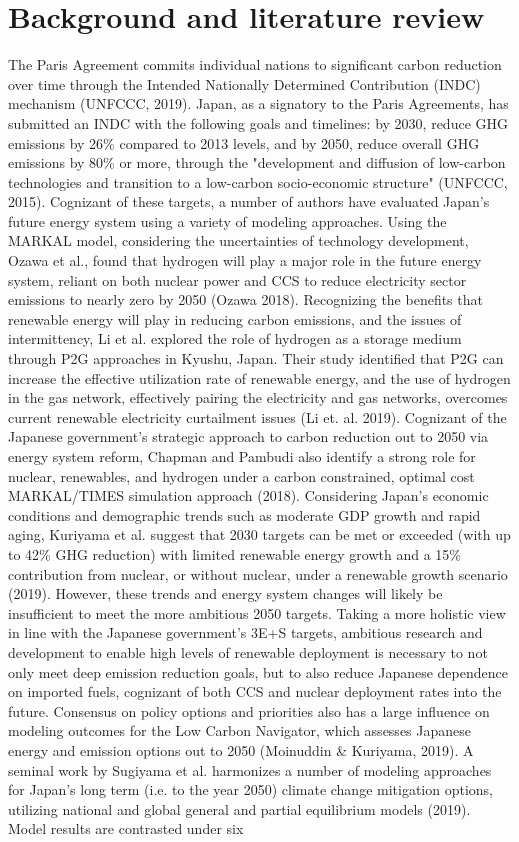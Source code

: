 \section{Background and literature review} \label{litreview}
The Paris Agreement commits individual nations to significant carbon reduction over time through the Intended Nationally Determined Contribution (INDC) mechanism (UNFCCC, 2019). Japan, as a signatory to the Paris Agreements, has submitted an INDC with the following goals and timelines: by 2030, reduce GHG emissions by 26\% compared to 2013 levels, and by 2050, reduce overall GHG emissions by 80\% or more, through the "development and diffusion of low-carbon technologies and transition to a low-carbon socio-economic structure" (UNFCCC, 2015). Cognizant of these targets, a number of authors have evaluated Japan's future energy system using a variety of modeling approaches. Using the \gls{MARKAL} model, considering the uncertainties of technology development, Ozawa et al., found that hydrogen will play a major role in the future energy system, reliant on both nuclear power and \gls{CCS} to reduce electricity sector emissions to nearly zero by 2050 (Ozawa 2018). Recognizing the benefits that renewable energy will play in reducing carbon emissions, and the issues of intermittency, Li et al. explored the role of hydrogen as a storage medium through \gls{P2G} approaches in Kyushu, Japan. Their study identified that \gls{P2G} can increase the effective utilization rate of renewable energy, and the use of hydrogen in the gas network, effectively pairing the electricity and gas networks, overcomes current renewable electricity curtailment issues (Li et. al. 2019). Cognizant of the Japanese government's strategic approach to carbon reduction out to 2050 via energy system reform, Chapman and Pambudi also identify a strong role for nuclear, renewables, and hydrogen under a carbon constrained, optimal cost MARKAL/TIMES simulation approach (2018). Considering Japan's economic conditions and demographic trends such as moderate GDP growth and rapid aging, Kuriyama et al. suggest that 2030 targets can be met or exceeded (with up to 42\% GHG reduction) with limited renewable energy growth and a 15\% contribution from nuclear, or without nuclear, under a renewable growth scenario (2019). However, these trends and energy system changes will likely be insufficient to meet the more ambitious 2050 targets. Taking a more holistic view in line with the Japanese government's 3E+S targets, ambitious research and development to enable high levels of renewable deployment is necessary to not only meet deep emission reduction goals, but to also reduce Japanese dependence on imported fuels, cognizant of both CCS and nuclear deployment rates into the future. Consensus on policy options and priorities also has a large influence on modeling outcomes for the Low Carbon Navigator, which assesses Japanese energy and emission options out to 2050 (Moinuddin \& Kuriyama, 2019). A seminal work by Sugiyama et al. harmonizes a number of modeling approaches for Japan's long term (i.e. to the year 2050) climate change mitigation options, utilizing national and global general and partial equilibrium models (2019). Model results are contrasted under six 